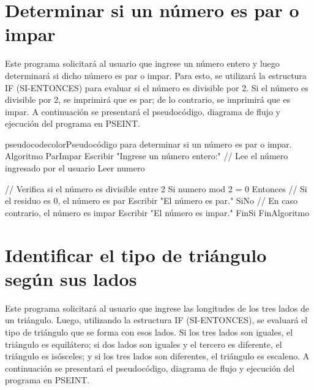 \documentclass[
	spanish, %
	letterpaper, oneside
]{article}
\begin{document}
\section{Determinar si un número es par o impar}

Este programa solicitará al usuario que ingrese un número entero y luego determinará si dicho número es par o impar. Para esto, se utilizará la estructura IF (SI-ENTONCES) para evaluar si el número es divisible por 2. Si el número es divisible por 2, se imprimirá que es par; de lo contrario, se imprimirá que es impar. A continuación se presentará el pseudocódigo, diagrama de flujo y ejecución del programa en PSEINT.

\begin{sourcecode}{pseudocodecolor}{Pseudocódigo para determinar si un número es par o impar.}
Algoritmo ParImpar
    Escribir "Ingrese un número entero:"
    // Lee el número ingresado por el usuario
    Leer numero
	
    // Verifica si el número es divisible entre 2
    Si numero mod 2 = 0 Entonces
        // Si el residuo es 0, el número es par
        Escribir "El número es par."
    SiNo
        // En caso contrario, el número es impar
        Escribir "El número es impar."
    FinSi
FinAlgoritmo
\end{sourcecode}



\section{Identificar el tipo de triángulo según sus lados}

Este programa solicitará al usuario que ingrese las longitudes de los tres lados de un triángulo. Luego, utilizando la estructura IF (SI-ENTONCES), se evaluará el tipo de triángulo que se forma con esos lados. Si los tres lados son iguales, el triángulo es equilátero; si dos lados son iguales y el tercero es diferente, el triángulo es isósceles; y si los tres lados son diferentes, el triángulo es escaleno. A continuación se presentará el pseudocódigo, diagrama de flujo y ejecución del programa en PSEINT.
\end{document}
